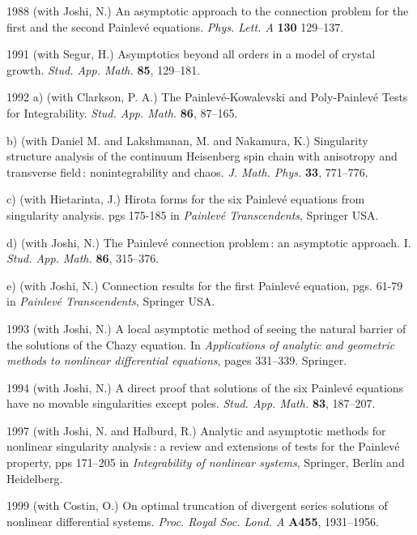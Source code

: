 \documentclass[11pt]{article}
\begin{document}
\item[1988] (with Joshi, N.) An asymptotic approach to the connection problem for the first and the second 
Painlev\'e equations. \textit{Phys. Lett. A} \textbf{130} 129--137.

\item[1991] (with Segur, H.) Asymptotics beyond all orders in a model of crystal growth. \textit{Stud. App. Math.} \textbf{85}, 129--181. 

\item[1992] a) (with Clarkson, P. A.) The Painlev\'e-Kowalevski and Poly‐Painlev\'e Tests for Integrability. 
\textit{Stud. App. Math.} \textbf{86},  87--165.

b) (with Daniel M. and Lakshmanan, M. and Nakamura, K.) Singularity structure analysis of the continuum 
Heisenberg spin chain with anisotropy and transverse field\,: nonintegrability and chaos. \textit{J. Math. Phys.} 
\textbf{33}, 771--776.

c) (with Hietarinta, J.) Hirota forms for the six Painlev\'e equations from singularity analysis.  
pgs 175-185 in \textit{Painlev\'e Transcendents}, Springer USA.

d) (with Joshi, N.)  The Painlev\'e connection problem\,: an asymptotic approach. I. \textit{Stud. 
App. Math.} \textbf{86}, 315--376.

e) (with Joshi, N.) Connection results for the first Painlev\'e equation, pgs. 61-79 in \textit{Painlev\'e Transcendents}, Springer USA.

\item[1993] (with Joshi, N.) A local asymptotic method of seeing the natural barrier of the solutions of the Chazy 
equation. In \textit{Applications of analytic and geometric methods to nonlinear differential equations}, pages 331--339. Springer.

\item[1994] (with Joshi, N.)  A direct proof that solutions of the six Painlev\'e equations have no movable 
singularities except poles. \textit{Stud. App. Math.} \textbf{83}, 187--207.

\item[1997] (with Joshi, N. and Halburd, R.) Analytic and asymptotic methods for nonlinear singularity analysis\,: 
a review and extensions of tests for the Painlev\'e property, pps 171--205 in \textit{Integrability of nonlinear 
systems}, Springer, Berlin and Heidelberg.

\item[1999] (with Costin, O.) On optimal truncation of divergent series solutions of nonlinear differential systems. \textit{Proc. Royal Soc. Lond. A} \textbf{A455}, 1931--1956.
\end{document}
